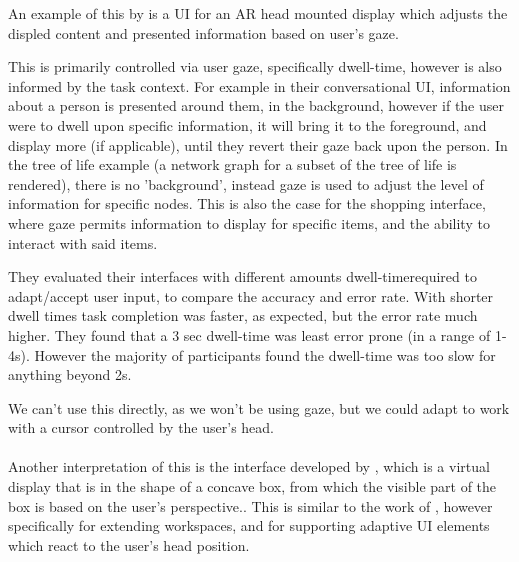 An example of this by \citeauthor{pfeuffer2021artention} is a UI for an AR head mounted display which adjusts the displed content and presented information based on user's gaze\cite{pfeuffer2021artention}.

This is primarily controlled via user gaze, specifically dwell-time, however is also informed by the task context.
For example in their conversational UI, information about a person is presented around them, in the background, however if the user were to dwell upon specific information, it will bring it to the foreground, and display more (if applicable), until they revert their gaze back upon the person.
In the tree of life example (a network graph for a subset of the tree of life is rendered), there is no 'background', instead gaze is used to adjust the level of information for specific nodes.
This is also the case for the shopping interface, where gaze permits information to display for specific items, and the ability to interact with said items.

They evaluated their interfaces with different amounts dwell-timerequired to adapt/accept user input, to compare the accuracy and error rate.
With shorter dwell times task completion was faster, as expected, but the error rate much higher. They found that a 3 sec dwell-time was least error prone (in a range of 1-4s).
However the majority of participants found the dwell-time was too slow for anything beyond 2s.

We can't use this directly, as we won't be using gaze, but we could adapt to work with a cursor controlled by the user's head.
\\\\

Another interpretation of this is the interface developed by \citeauthor{lopez2012head}, which is a virtual display that is in the shape of a concave box, from which the visible part of the box is based on the user's perspective.\cite{lopez2012head}. 
This is similar to the work of \citeauthor{francone2011using}, however specifically for extending workspaces, and for supporting adaptive UI elements which react to the user's head position.

